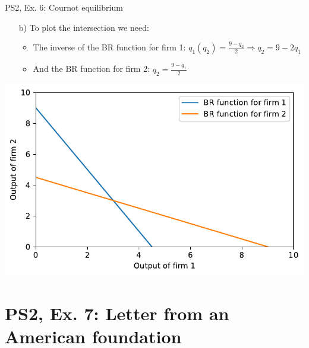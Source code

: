 \begin{frame}{PS2, Ex. 6: Cournot equilibrium}
    \begin{itemize}
      \item[b)] To plot the intersection we need:
      \begin{itemize}\normalsize
        \item The inverse of the BR function for firm 1: $q_1(q_2) = \frac{9-q_2}{2} \Rightarrow q_2 = 9-2q_1$
        \item And the BR function for firm 2: $q_2 = \frac{9-q_1}{2}$
      \end{itemize}
    \end{itemize}
   \includegraphics[width=1 \textwidth]{figures/br}
\end{frame}


\section{PS2, Ex. 7: Letter from an American foundation}

